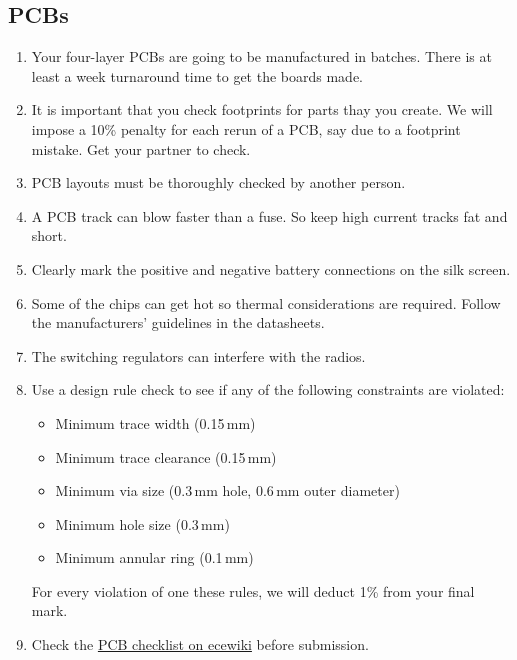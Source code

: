 \documentclass[11pt, a4paper]{article}
\begin{document}
\subsection{PCBs}

\begin{enumerate}
\item Your four-layer PCBs are going to be manufactured in batches.
  There is at least a week turnaround time to get the boards made.

\item It is important that you check footprints for parts thay you
  create.  We will impose a 10\% penalty for each rerun of a PCB, say
  due to a footprint mistake.  Get your partner to check.
  
\item PCB layouts must be thoroughly checked by another person.
  
\item A PCB track can blow faster than a fuse. So keep high current
  tracks fat and short.

\item Clearly mark the positive and negative battery connections on
  the silk screen.

\item Some of the chips can get hot so thermal considerations are
  required.  Follow the manufacturers' guidelines in the datasheets.

\item The switching regulators can interfere with the radios.
  
\item Use a design rule check to see if any of the following
  constraints are violated:
%
\begin{itemize}
\item Minimum trace width (0.15\,mm)
\item Minimum trace clearance (0.15\,mm)
\item Minimum via size (0.3\,mm hole, 0.6\,mm outer diameter)
\item Minimum hole size (0.3\,mm)
\item Minimum annular ring (0.1\,mm)
\end{itemize}
%
For every violation of one these rules, we will deduct 1\% from your
final mark.

\item Check the
  \href{http://ecewiki.elec.canterbury.ac.nz/mediawiki/index.php/PCB_checklist}{PCB
    checklist on ecewiki} before submission.
\end{enumerate}
\end{document}
